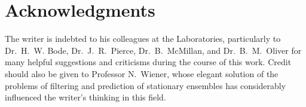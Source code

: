 \section*{Acknowledgments}
The writer is indebted to his colleagues at the Laboratories, particularly
to Dr.~H.~W. Bode, Dr.~J.~R.~Pierce, Dr.~B.~McMillan, and
Dr.~B.~M.~Oliver for many helpful suggestions and criticisms during the
course of this work.  Credit should also be given to Professor N.~Wiener,
whose elegant solution of the problems of filtering and prediction of
stationary ensembles has considerably influenced the writer's thinking in
this field.

